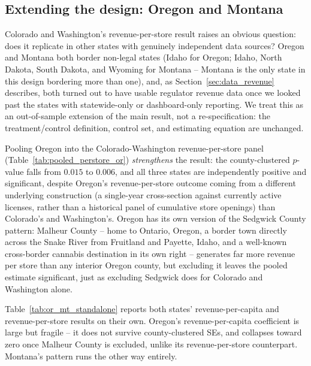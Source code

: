 ﻿\documentclass{article}
\begin{document}
\subsection{Extending the design: Oregon and Montana}
\label{sec:or_mt}

Colorado and Washington's revenue-per-store result raises an obvious question: does it replicate in other
states with genuinely independent data sources? Oregon and Montana both border non-legal states (Idaho
for Oregon; Idaho, North Dakota, South Dakota, and Wyoming for Montana -- Montana is the only state in
this design bordering more than one), and, as Section~\ref{sec:data_revenue} describes, both turned out to
have usable regulator revenue data once we looked past the states with statewide-only or dashboard-only
reporting. We treat this as an out-of-sample extension of the main result, not a re-specification: the
treatment/control definition, control set, and estimating equation are unchanged.



Pooling Oregon into the Colorado-Washington revenue-per-store panel (Table~\ref{tab:pooled_perstore_or})
\emph{strengthens} the result: the county-clustered $p$-value falls from $0.015$ to $0.006$, and all three
states are independently positive and significant, despite Oregon's revenue-per-store outcome coming from
a different underlying construction (a single-year cross-section against currently active licenses, rather
than a historical panel of cumulative store openings) than Colorado's and Washington's. Oregon has its own
version of the Sedgwick County pattern: Malheur County -- home to Ontario, Oregon, a border town directly
across the Snake River from Fruitland and Payette, Idaho, and a well-known cross-border cannabis
destination in its own right -- generates far more revenue per store than any interior Oregon county, but
excluding it leaves the pooled estimate significant, just as excluding Sedgwick does for Colorado and
Washington alone.



Table~\ref{tab:or_mt_standalone} reports both states' revenue-per-capita and revenue-per-store results on
their own. Oregon's revenue-per-capita coefficient is large but fragile -- it does not survive
county-clustered SEs, and collapses toward zero once Malheur County is excluded, unlike its
revenue-per-store counterpart. Montana's pattern runs the other way entirely.
\end{document}
